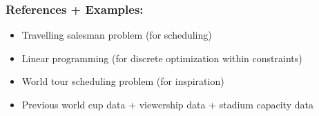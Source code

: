 \documentclass[letterpaper,12pt]{article}
\begin{document}
\subsubsection*{References + Examples: } 
\begin{itemize}
\itemsep0em 
\item Travelling salesman problem (for scheduling)
\item Linear programming (for discrete optimization within constraints)
\item World tour scheduling problem (for inspiration)
\item Previous world cup data + viewership data + stadium capacity data
\end{itemize}
\end{document}
